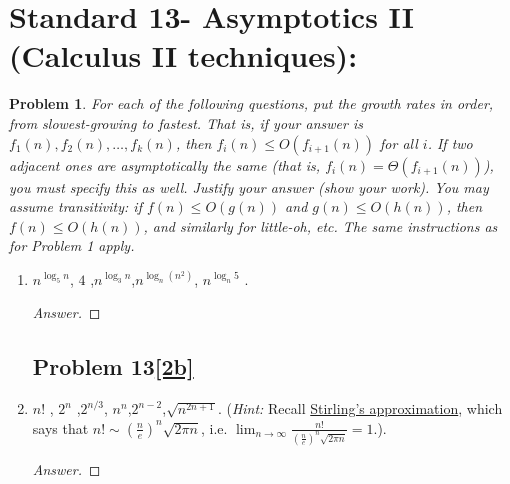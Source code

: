 \documentclass[11pt]{article}
\theoremstyle{definition}
\theoremstyle{definition}
\newtheorem{required}{Problem}
\theoremstyle{definition}
\begin{document}
\section{Standard 13- Asymptotics II (Calculus II techniques): }
\begin{required}



    {\itshape For each of the following questions, put the growth rates in order, from slowest-growing to fastest. That is, if your answer is $f_1(n), f_2(n), \dotsc, f_k(n)$, then $f_i(n) \leq O(f_{i+1}(n))$ for all $i$. If two adjacent ones are asymptotically the same (that is, $f_i(n) = \Theta(f_{i+1}(n))$), you must specify this as well. 
    Justify your answer (show your work). You may assume transitivity: if $f(n) \leq O(g(n))$ and $g(n) \leq O(h(n))$, then $f(n) \leq O(h(n))$, and similarly for little-oh, etc. The same instructions as for Problem 1 apply.}
    \begin{enumerate}[label=(\alph*)]
\subsection{Problem 13\ref{2a}}
        \item \label{2a} $n^{\log_5 n}$, \qquad $4$ ,\qquad $n^{\log_3 n}$,\qquad  $n^{\log_n(n^2)}$, \qquad $ n^{\log_n 5}$ .
        \begin{proof}[Answer]

        \end{proof}
        \newpage

\subsection{Problem 13\ref{2b}}
        \item \label{2b} $n!$ , \qquad $2^n$ ,\qquad  $2^{n/3}$, \qquad  $n^n$,\qquad $2^{n-2}$,\qquad  $\sqrt{n^{2n+1}}$. (\emph{Hint:} Recall \href{https://en.wikipedia.org/wiki/Stirling\%27s_approximation}{Stirling's approximation}, which says that $n! \sim \left(\frac{n}{e}\right)^n \sqrt{2 \pi n}$, i.e. $\lim_{n \to \infty} \frac{n!}{\left(\frac{n}{e}\right)^n \sqrt{2 \pi n}} = 1$.).
        \begin{proof}[Answer]

        \end{proof}
\end{enumerate}

\end{required}

\newpage
\end{document}
